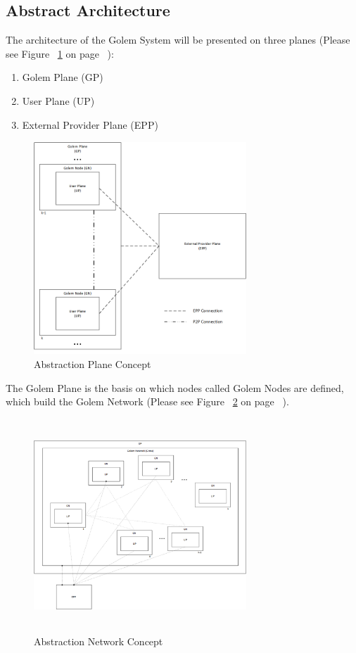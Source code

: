 \newpage

\subsection{Abstract Architecture}

The architecture of the Golem System will be presented on three planes 
(Please see Figure ~\ref{fig:Plane} on page ~\pageref{fig:Plane}):

\begin{enumerate}
	\item Golem Plane (GP)
	\item User Plane (UP)
	\item External Provider Plane (EPP)
\end{enumerate}

\begin{figure}[htbp]
    \centering
    \includegraphics[width=8cm,height=8cm,angle=0]{./diag/Abstract/GolemSystemPlane-Abstract.png}
    \caption{Abstraction Plane Concept}
	\label{fig:Plane}
\end{figure}

The Golem Plane is the basis on which nodes called Golem Nodes are defined, which build the Golem Network 
(Please see Figure ~\ref{fig:Ntw} on page ~\pageref{fig:Ntw}).

\begin{figure}[htbp]
    \centering
    \includegraphics[width=8cm,height=8cm,angle=0]{./diag/Abstract/GolemSystemNetwork-Abstract.png}
	\caption{Abstraction Network Concept}
    \label{fig:Ntw}
\end{figure}

